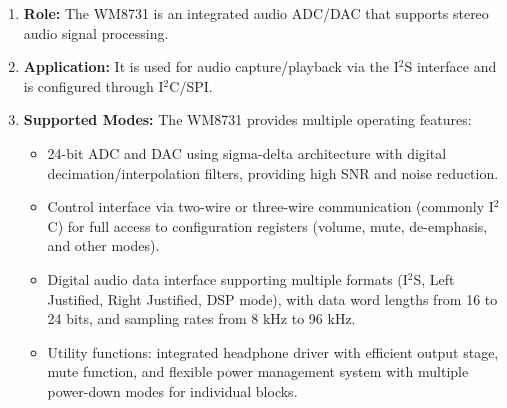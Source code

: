 \begin{enumerate}[label=\alph*)]
	
	\item \textbf{Role:} The WM8731 is an integrated audio ADC/DAC that supports stereo audio signal processing.  
	
	\item \textbf{Application:} It is used for audio capture/playback via the I$^2$S interface and is configured through I$^2$C/SPI.  
	
	\item \textbf{Supported Modes:} The WM8731 provides multiple operating features:
	\begin{itemize}[label=-]
		\item 24-bit ADC and DAC using sigma-delta architecture with digital decimation/interpolation filters, providing high SNR and noise reduction.  
		\item Control interface via two-wire or three-wire communication (commonly I$^2$C) for full access to configuration registers (volume, mute, de-emphasis, and other modes).  
		\item Digital audio data interface supporting multiple formats (I$^2$S, Left Justified, Right Justified, DSP mode), with data word lengths from 16 to 24 bits, and sampling rates from 8 kHz to 96 kHz.  
		\item Utility functions: integrated headphone driver with efficient output stage, mute function, and flexible power management system with multiple power-down modes for individual blocks.  
	\end{itemize}
	

\end{enumerate}
